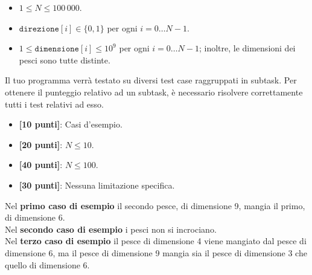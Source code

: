 \Constraints
\begin{itemize}[nolistsep, itemsep=2mm]
	\item $1 \le N \le 100\,000$.
	\item $\texttt{direzione}[i] \in \{0, 1\}$ per ogni $i=0\ldots N-1$.
	\item $1 \le \texttt{dimensione}[i] \le 10^9$ per ogni $i=0\ldots N-1$; inoltre, le dimensioni dei pesci sono tutte distinte.
\end{itemize}

\Scoring
Il tuo programma verrà testato su diversi test case raggruppati in subtask.
Per ottenere il punteggio relativo ad un subtask, è necessario risolvere
correttamente tutti i test relativi ad esso.

\begin{itemize}[nolistsep,itemsep=2mm]
  \item \textbf{ [10 punti]}: Casi d'esempio.
  \item \textbf{ [20 punti]}: $N \leq 10$.
  \item \textbf{ [40 punti]}: $N \leq 100$.
  \item \textbf{ [30 punti]}: Nessuna limitazione specifica.
\end{itemize}

\Examples
\begin{example}
%
\end{example}
\begin{example}
%
\end{example}
\begin{example}
%
\end{example}

\pagebreak
\Explanation
Nel \textbf{primo caso di esempio} il secondo pesce, di dimensione 9, mangia il primo, di dimensione 6.\\[2mm]
Nel \textbf{secondo caso di esempio} i pesci non si incrociano.\\[2mm]
Nel \textbf{terzo caso di esempio} il pesce di dimensione 4 viene mangiato dal pesce di dimensione 6, ma il pesce di dimensione 9 mangia sia il pesce di dimensione 3 che quello di dimensione 6.